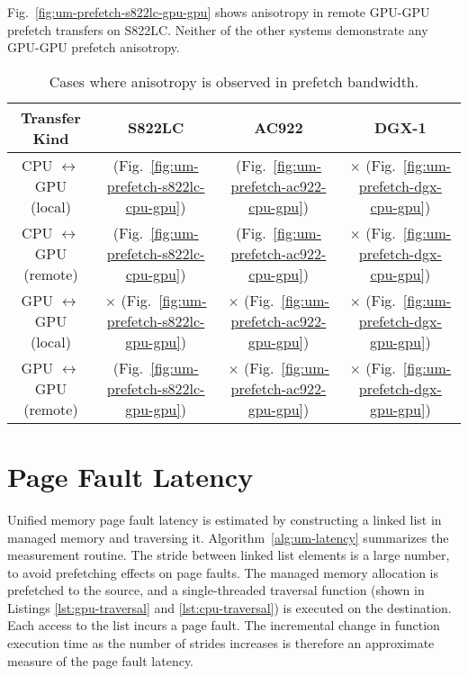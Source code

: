 Fig.~\ref{fig:um-prefetch-s822lc-gpu-gpu} shows anisotropy in remote GPU-GPU prefetch transfers on S822LC.
Neither of the other systems demonstrate any GPU-GPU prefetch anisotropy.

\begin{table}[ht]
	\centering
	\caption[Anisotropy in Prefetch Bandwidth]{
		Cases where anisotropy is observed in prefetch bandwidth.
	}
	\label{tab:um-prefetch-anisotropy}
	\begin{tabular}{cccc}
		\hline
		\textbf{Transfer Kind}             & \textbf{S822LC}                                         & \textbf{AC922}                                         & \textbf{DGX-1}                            \\ \hline 
		CPU $\leftrightarrow$ GPU (local)  & \checkmark (Fig.~\ref{fig:um-prefetch-s822lc-cpu-gpu}) & \checkmark (Fig.~\ref{fig:um-prefetch-ac922-cpu-gpu}) & $\times$ (Fig.~\ref{fig:um-prefetch-dgx-cpu-gpu}) \\ \hline
		CPU $\leftrightarrow$ GPU (remote) & \checkmark (Fig.~\ref{fig:um-prefetch-s822lc-cpu-gpu}) & \checkmark (Fig.~\ref{fig:um-prefetch-ac922-cpu-gpu}) & $\times$ (Fig.~\ref{fig:um-prefetch-dgx-cpu-gpu}) \\ \hline
		GPU $\leftrightarrow$ GPU (local)  & $\times$   (Fig.~\ref{fig:um-prefetch-s822lc-gpu-gpu}) & $\times$   (Fig.~\ref{fig:um-prefetch-ac922-gpu-gpu}) & $\times$ (Fig.~\ref{fig:um-prefetch-dgx-gpu-gpu}) \\ \hline
		GPU $\leftrightarrow$ GPU (remote) & \checkmark (Fig.~\ref{fig:um-prefetch-s822lc-gpu-gpu}) & $\times$   (Fig.~\ref{fig:um-prefetch-ac922-gpu-gpu}) & $\times$ (Fig.~\ref{fig:um-prefetch-dgx-gpu-gpu}) \\ \hline
	\end{tabular}
\end{table}

%
%
%

\section{Page Fault Latency}
\label{sec:um-page-fault}

Unified memory page fault latency is estimated by constructing a linked list in managed memory and traversing it.
Algorithm~\ref{alg:um-latency} summarizes the measurement routine.
The stride between linked list elements is a large number, to avoid prefetching effects on page faults.
The managed memory allocation is prefetched to the source, and a single-threaded traversal function (shown in Listings \ref{lst:gpu-traversal} and \ref{lst:cpu-traversal}) is executed on the destination.
Each access to the list incurs a page fault.
The incremental change in function execution time as the number of strides increases is therefore an approximate measure of the page fault latency.


